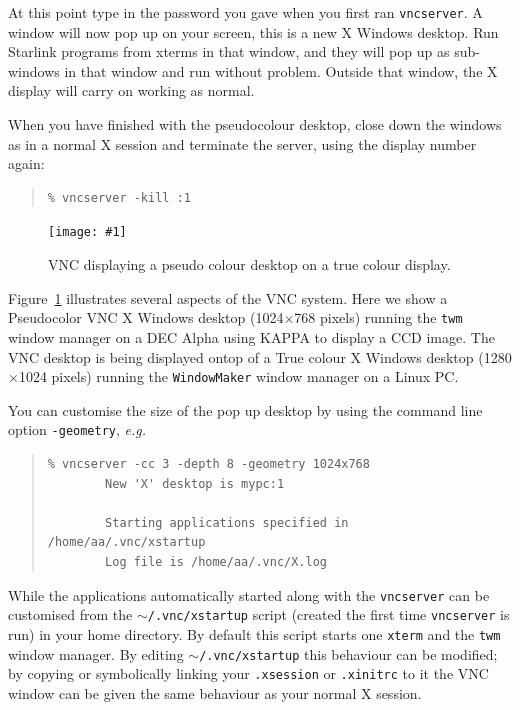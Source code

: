 \documentclass[twoside,11pt]{article}
\newcommand{\htmladdimg}[1]{}
\newcommand{\xref}[3]{#1}
\newcommand{\myfig} [5] {
  \begin{figure}
    \centering\texttt{[image: \#1]}
    \typeout{#1 inserted on page \arabic{page}}
    \caption{\label{#4}#5}
  \end{figure}
  }
\newcommand{\myfig}[5]{
    \label{#4} \htmladdimg{#3}\\
    Figure: #5\\
    }
\begin{document}
At this point type in the password you gave when you first ran {\tt vncserver}. A window will now pop up on your screen, this is a new X Windows desktop. Run Starlink programs from xterms in that window, and they will pop up as sub-windows in that window and run without problem. Outside that window, the X display will carry on working as normal. 

When you have finished with the pseudocolour desktop, close down the windows as in a normal X session and terminate the server, using the display number again: 

\small
\begin{quote}
\begin{verbatim}
% vncserver -kill :1    
\end{verbatim}
\end{quote}
\normalsize   
 \myfig{sc15_vnc.eps}{height=0.45\textheight}{sc15_vnc.gif}{sc15_vnc_example1}{VNC displaying a pseudo colour desktop on a true colour display.}
 
Figure~\ref{sc15_vnc_example1} illustrates several aspects of the VNC system. Here we show a Pseudocolor VNC X Windows desktop (1024$\times$768 pixels) running the {\tt twm} window manager on a DEC Alpha using \xref{KAPPA}{sun95}{} to display a CCD image. The VNC desktop is being displayed ontop of a True colour X Windows desktop (1280$\times$1024 pixels) running the {\tt WindowMaker} window manager on a Linux PC.

You can customise the size of the pop up desktop by using the command line option {\tt -geometry}, {\em e.g.\ } 

\small
\begin{quote}
\begin{verbatim}
% vncserver -cc 3 -depth 8 -geometry 1024x768
        New 'X' desktop is mypc:1

        Starting applications specified in /home/aa/.vnc/xstartup
        Log file is /home/aa/.vnc/X.log
\end{verbatim}
\end{quote}
\normalsize

While the applications automatically started along with the {\tt vncserver} can be customised from the {\tt $\sim$/.vnc/xstartup} script (created the first time {\tt vncserver} is run) in your home directory. By default this script starts one {\tt xterm} and the {\tt twm} window manager. By editing {\tt $\sim$/.vnc/xstartup} this behaviour can be modified; by copying or symbolically linking your {\tt .xsession} or {\tt .xinitrc} to it the VNC window can be given the same behaviour as your normal X session.
\end{document}
